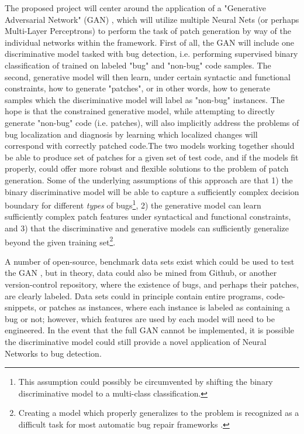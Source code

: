 \documentclass{article}
\begin{document}
The proposed project will center around the application of  a "Generative Adversarial Network" (GAN) \cite{goodfellow2014generative}, which will utilize multiple Neural Nets (or perhaps Multi-Layer Perceptrons) to perform the task of patch generation by way of the individual networks within the framework. First of all, the GAN will include one discriminative model tasked with bug detection, i.e. performing supervised binary classification of trained on labeled "bug" and "non-bug" code samples. The second, generative model will then learn, under certain syntactic and functional constraints, how to generate "patches", or in other words, how to generate samples which the discriminative model will label as "non-bug" instances. The hope is that the constrained generative model, while attempting to directly generate "non-bug" code (i.e. patches), will also implicitly address the problems of bug localization and diagnosis by learning which localized changes will correspond with correctly patched code.The two models working together should be able to produce set of patches for a given set of test code, and if the models fit properly, could offer more robust and flexible solutions to the problem of patch generation. Some of the underlying assumptions of this approach are that 1) the binary discriminative model will be able to 
capture a sufficiently complex decision boundary for different \textit{types} of bugs\footnote{This assumption could possibly be circumvented by shifting the binary discriminative model to a multi-class classification.}, 2) the generative model 
can learn sufficiently complex patch features under syntactical and functional constraints, and 3) that the discriminative and generative models can sufficiently generalize beyond the given training set\footnote{Creating a model which properly generalizes to the problem is recognized as a difficult task for most automatic bug repair frameworks \cite{le2013current,smith2015cure}.}.

A number of open-source, benchmark data sets exist which could be used to test the GAN \cite{just2014defects4j,berlin2017bug,tan2017codeflaws,le2015manybugs}, but in theory, data could also be mined from Github, or another version-control repository, where the existence of bugs, and perhaps their patches, are clearly labeled. Data sets could in principle contain entire programs, code-snippets, or patches as instances, where each instance is labeled as containing a bug or not; however, which features are used by each model will need to be engineered. In the event that the full GAN cannot be implemented, it is possible the discriminative model could still provide a novel application of Neural Networks to bug detection.
\end{document}
